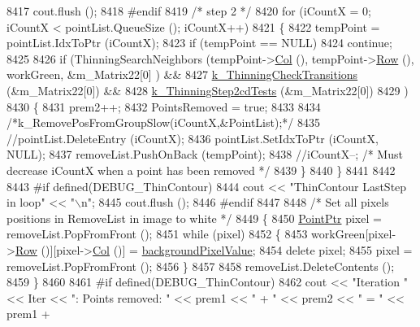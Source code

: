 \begin{DoxyCode}
8417       cout.flush ();
8418 \textcolor{preprocessor}{    #endif}
8419     \textcolor{comment}{/* step 2 */}
8420     \textcolor{keywordflow}{for}  (iCountX = 0; iCountX < pointList.QueueSize (); iCountX++)
8421     \{
8422        tempPoint = pointList.IdxToPtr (iCountX);
8423        \textcolor{keywordflow}{if}  (tempPoint == NULL)
8424          \textcolor{keywordflow}{continue};
8425 
8426        \textcolor{keywordflow}{if}  (ThinningSearchNeighbors  (tempPoint->\hyperlink{class_k_k_b_1_1_point_afb196b03757fc697f6ade0129a1c7fcf}{Col} (), tempPoint->\hyperlink{class_k_k_b_1_1_point_abfc34bcf809fc9fb95baf5c745b07549}{Row} (), workGreen, &m\_Matrix22[0]
      )   &&
8427             \hyperlink{_raster_8cpp_a26369c862acddcbd9e8b1eb2913adb20}{k\_ThinningCheckTransitions} (&m\_Matrix22[0]) &&
8428             \hyperlink{_raster_8cpp_ad105800cd4251636e5f095579574a73b}{k\_ThinningStep2cdTests}     (&m\_Matrix22[0])
8429            )
8430        \{
8431          prem2++;
8432          PointsRemoved = \textcolor{keyword}{true};
8433 
8434          \textcolor{comment}{/*k\_RemovePosFromGroupSlow(iCountX,&PointList);*/}
8435          \textcolor{comment}{//pointList.DeleteEntry (iCountX);}
8436          pointList.SetIdxToPtr (iCountX, NULL);
8437          removeList.PushOnBack (tempPoint);
8438          \textcolor{comment}{//iCountX--; /* Must decrease iCountX when a point has been removed */}
8439        \}
8440     \}
8441 
8442 
8443 \textcolor{preprocessor}{    #if  defined(DEBUG\_ThinContour)}
8444       cout << \textcolor{stringliteral}{"ThinContour  LastStep in loop"} << \textcolor{stringliteral}{"\(\backslash\)n"};
8445       cout.flush ();
8446 \textcolor{preprocessor}{    #endif}
8447 
8448     \textcolor{comment}{/* Set all pixels positions in RemoveList in image to white */}
8449     \{
8450       \hyperlink{class_k_k_b_1_1_point}{PointPtr}  pixel = removeList.PopFromFront ();
8451       \textcolor{keywordflow}{while}  (pixel)
8452       \{
8453         workGreen[pixel->\hyperlink{class_k_k_b_1_1_point_abfc34bcf809fc9fb95baf5c745b07549}{Row} ()][pixel->\hyperlink{class_k_k_b_1_1_point_afb196b03757fc697f6ade0129a1c7fcf}{Col} ()] = \hyperlink{class_k_k_b_1_1_raster_ab7ed2191cce116a6a37029dc6e3713ef}{backgroundPixelValue};
8454         \textcolor{keyword}{delete} pixel;
8455         pixel = removeList.PopFromFront ();
8456       \}
8457 
8458       removeList.DeleteContents ();
8459     \}
8460 
8461 \textcolor{preprocessor}{    #if  defined(DEBUG\_ThinContour)}
8462       cout << \textcolor{stringliteral}{"Iteration "} << Iter << \textcolor{stringliteral}{": Points removed: "} << prem1 << \textcolor{stringliteral}{" + "} << prem2 << \textcolor{stringliteral}{" = "} << prem1 + 

\end{DoxyCode}
